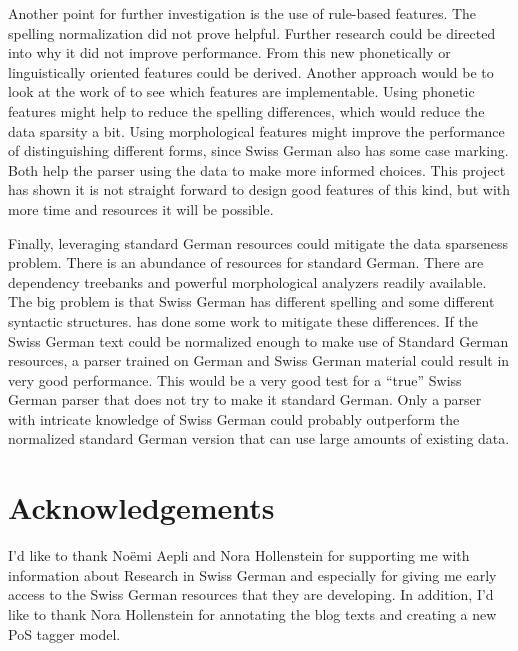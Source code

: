 \documentclass[11pt,letterpaper, covington]{article}
\begin{document}
Another point for further investigation is the use of rule-based features. The spelling normalization did not prove helpful. Further research could be directed into why it did not improve performance. From this new phonetically or linguistically oriented features could be derived. Another approach would be to look at the work of \citet{SR10} to see which features are implementable. Using phonetic features might help to reduce the spelling differences, which would reduce the data sparsity a bit. Using morphological features might improve the performance of distinguishing different forms, since Swiss German also has some case marking. Both help the parser using the data to make more informed choices. This project has shown it is not straight forward to design good features of this kind, but with more time and resources it will be possible.

Finally, leveraging standard German resources could mitigate the data sparseness problem. There is an abundance of resources for standard German. There are dependency treebanks and powerful morphological analyzers readily available. The big problem is that Swiss German has different spelling and some different syntactic structures. \citet{Scherrer11} has done some work to mitigate these differences. If the Swiss German text could be normalized enough to make use of Standard German resources, a parser trained on German and Swiss German material could result in very good performance. This would be a very good test for a ``true'' Swiss German parser that does not try to make it standard German. Only a parser with intricate knowledge of Swiss German could probably outperform the normalized standard German version that can use large amounts of existing data. 

\section{Acknowledgements}
I'd like to thank Noëmi Aepli and Nora Hollenstein for supporting me with information about Research in Swiss German and especially for giving me early access to the Swiss German resources that they are developing. In addition, I'd like to thank Nora Hollenstein for annotating the blog texts and creating a new PoS tagger model.



\label{lastpage}
\end{document}
